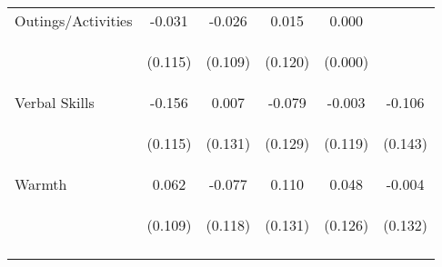 \begin{tabular}{lccccc}
\noalign{\smallskip}Outings/Activities & -0.031 & -0.026 & 0.015 & 0.000 & \\
 & \begin{footnotesize}(0.115)\end{footnotesize} & \begin{footnotesize}(0.109)\end{footnotesize} & \begin{footnotesize}(0.120)\end{footnotesize} & \begin{footnotesize}(0.000)\end{footnotesize} & \begin{footnotesize}\end{footnotesize}\\
\noalign{\smallskip}Verbal Skills & -0.156 & 0.007 & -0.079 & -0.003 & -0.106\\
 & \begin{footnotesize}(0.115)\end{footnotesize} & \begin{footnotesize}(0.131)\end{footnotesize} & \begin{footnotesize}(0.129)\end{footnotesize} & \begin{footnotesize}(0.119)\end{footnotesize} & \begin{footnotesize}(0.143)\end{footnotesize}\\
\noalign{\smallskip}Warmth & 0.062 & -0.077 & 0.110 & 0.048 & -0.004\\
 & \begin{footnotesize}(0.109)\end{footnotesize} & \begin{footnotesize}(0.118)\end{footnotesize} & \begin{footnotesize}(0.131)\end{footnotesize} & \begin{footnotesize}(0.126)\end{footnotesize} & \begin{footnotesize}(0.132)\end{footnotesize}\\
\noalign{\smallskip}\hline\end{tabular}\\
